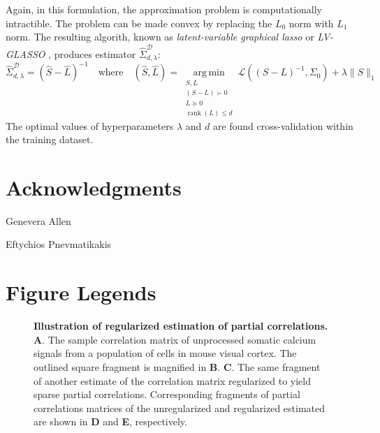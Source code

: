 \documentclass[10pt]{article}
\newcommand{\loss}[1]{\mathcal L\left(#1\right)}
\DeclareMathOperator*{\argmin}{arg\,min}
\DeclareMathOperator{\rank}{rank}
\begin{document}
Again, in this formulation, the approximation problem is computationally intractible.  The problem can be made convex by replacing the $L_0$ norm with $L_1$ norm. The resulting algorith, known as \emph{latent-variable graphical lasso} or \emph{LV-GLASSO} \cite{Chandrasekaran:2010,Ma:2013}, produces estimator $\hat\Sigma_{d,\lambda}^{\mathcal D}$:
\begin{equation}
\hat\Sigma_{d,\lambda} ^{\mathcal D} = \left(\hat S-\hat L\right)^{-1}
\quad\mbox{where}\quad
(\hat S, \hat L) = \argmin\limits_{\substack{ S,L \\ (S-L)\succ 0 \\ L\succeq 0 \\ \rank(L) \le d}} \loss{(S-L)^{-1},\Sigma_0} + \lambda \| S \|_1 
\end{equation}
The optimal values of hyperparameters $\lambda$ and $d$ are found cross-validation within the training dataset.

\section*{Acknowledgments}
Genevera Allen

Eftychios Pnevmatikakis 




\section*{Figure Legends}

\begin{figure}[!ht]
    \begin{center}
    \end{center}
    \caption{{\bf Illustration of regularized estimation of partial correlations.}
        {\bf A}. The sample correlation matrix of unprocessed somatic calcium signals from a population of cells in mouse visual cortex.
        The outlined square fragment is magnified in {\bf B}.
        {\bf C}. The same fragment of another estimate of the correlation matrix regularized to yield sparse partial correlations.
        Corresponding fragments of partial correlations matrices of the unregularized and regularized estimated are shown in {\bf D} and {\bf E}, respectively.
    }
    \label{fig:01}
\end{figure}
\end{document}
